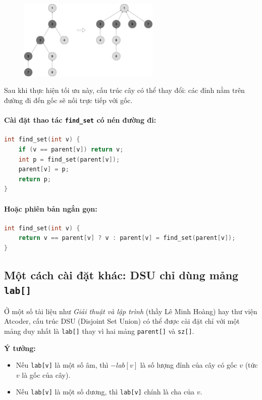 \begin{figure}[h]
    \centering
    \includegraphics[width=0.6\textwidth]{resource/img/b8/disjoint-set-union_img2.png}
\end{figure}

Sau khi thực hiện tối ưu này, cấu trúc cây có thể thay đổi: các đỉnh nằm trên đường đi đến gốc sẽ nối trực tiếp với gốc.

\paragraph{Cài đặt thao tác \texttt{find\_set} có nén đường đi:}
\begin{lstlisting}[language=C++]
int find_set(int v) {
    if (v == parent[v]) return v;
    int p = find_set(parent[v]);
    parent[v] = p;
    return p;
}
\end{lstlisting}

\paragraph{Hoặc phiên bản ngắn gọn:}
\begin{lstlisting}[language=C++]
int find_set(int v) {
    return v == parent[v] ? v : parent[v] = find_set(parent[v]);
}
\end{lstlisting}

\subsection*{Một cách cài đặt khác: DSU chỉ dùng mảng \texttt{lab[]}}

Ở một số tài liệu như \textit{Giải thuật và lập trình} (thầy Lê Minh Hoàng) hay thư viện Atcoder, cấu trúc DSU (Disjoint Set Union) có thể được cài đặt chỉ với một mảng duy nhất là \texttt{lab[]} thay vì hai mảng \texttt{parent[]} và \texttt{sz[]}.

\textbf{Ý tưởng:}
\begin{itemize}
    \item Nếu \texttt{lab[v]} là một số âm, thì $-lab[v]$ là số lượng đỉnh của cây có gốc $v$ (tức $v$ là gốc của cây).
    \item Nếu \texttt{lab[v]} là một số dương, thì \texttt{lab[v]} chính là cha của $v$.
\end{itemize}

